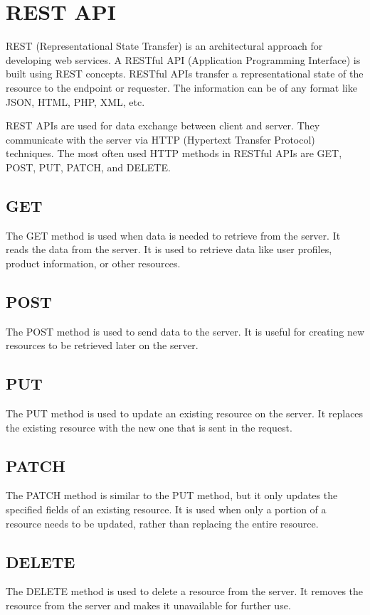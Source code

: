 \section{REST API}
REST (Representational State Transfer) is an architectural approach for developing web services. A RESTful API (Application Programming Interface) is built using REST concepts. RESTful APIs transfer a representational state of the resource to the endpoint or requester. The information can be of any format like JSON, HTML, PHP, XML, etc.

REST APIs are used for data exchange between client and server. They communicate with the server via HTTP (Hypertext Transfer Protocol) techniques. The most often used HTTP methods in RESTful APIs are GET, POST, PUT, PATCH, and DELETE.

\subsection{GET}
The GET method is used when data is needed to retrieve from the server. It reads the data from the server. It is used to retrieve data like user profiles, product information, or other resources.

\subsection{POST}
The POST method is used to send data to the server. It is useful for creating new resources to be retrieved later on the server.

\subsection{PUT}
The PUT method is used to update an existing resource on the server. It replaces the existing resource with the new one that is sent in the request.

\subsection{PATCH}
The PATCH method is similar to the PUT method, but it only updates the specified fields of an existing resource. It is used when only a portion of a resource needs to be updated, rather than replacing the entire resource.

\subsection{DELETE}
The DELETE method is used to delete a resource from the server. It removes the resource from the server and makes it unavailable for further use.